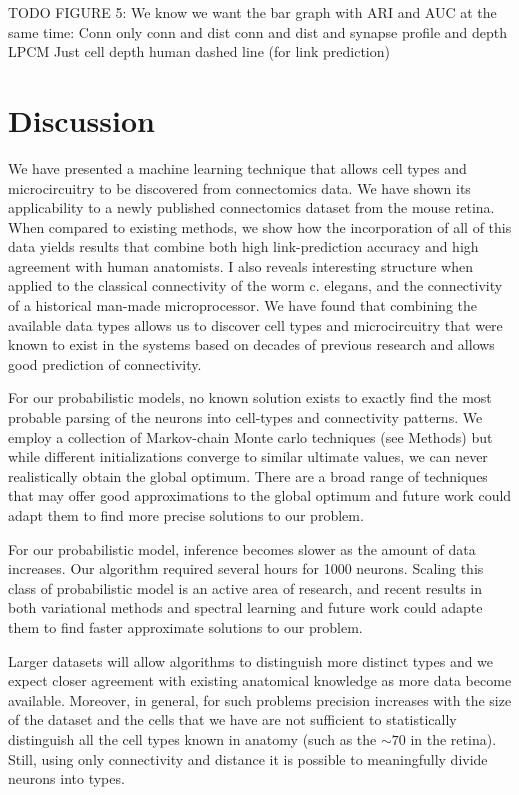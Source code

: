 \documentclass{nature}
\begin{document}
TODO FIGURE 5: 
We know we want the bar graph with ARI and AUC at the same time:
Conn only
conn and dist
conn and dist and synapse profile and depth
LPCM 
Just cell depth 
human dashed line (for link prediction) 

\section{Discussion}
We have presented a machine learning technique that allows cell types
and microcircuitry to be discovered from connectomics data.  We have
shown its applicability to a newly published connectomics dataset from
the mouse retina. When compared to existing methods, we show how the
incorporation of all of this data yields results that combine both
high link-prediction accuracy and high agreement with human
anatomists.  I also reveals interesting structure when applied to the
classical connectivity of the worm c. elegans, and the connectivity of
a historical man-made microprocessor. We have found that combining the
available data types allows us to discover cell types and
microcircuitry that were known to exist in the systems based on
decades of previous research and allows good prediction of
connectivity.

For our probabilistic models, no known solution exists to
exactly find the most probable parsing of the neurons into cell-types
and connectivity patterns. We employ a collection of Markov-chain
Monte carlo techniques (see Methods) but while different
initializations converge to similar ultimate values, we can never
realistically obtain the global optimum. There are a broad range of
techniques that may offer good approximations to the global optimum
and future work could adapt them to
find more precise solutions to our problem.

For our probabilistic model, inference becomes slower as the amount of
data increases. Our algorithm required several hours for 1000
neurons. Scaling this class of probabilistic model is an active area
of research, and recent results in both variational methods
\autocite{Hoffman2013} and spectral learning \autocite{Anandkumar2012}
and future work could adapte them to find faster approximate solutions
to our problem.

Larger datasets will allow algorithms to distinguish more distinct
types and we expect closer agreement with existing anatomical
knowledge as more data become available.  Moreover, in general, for
such problems precision increases with the size of the dataset and the
cells that we have are not sufficient to statistically distinguish all
the cell types known in anatomy (such as the $\sim 70$ in the
retina). Still, using only connectivity and distance it is possible to
meaningfully divide neurons into types.
\end{document}
